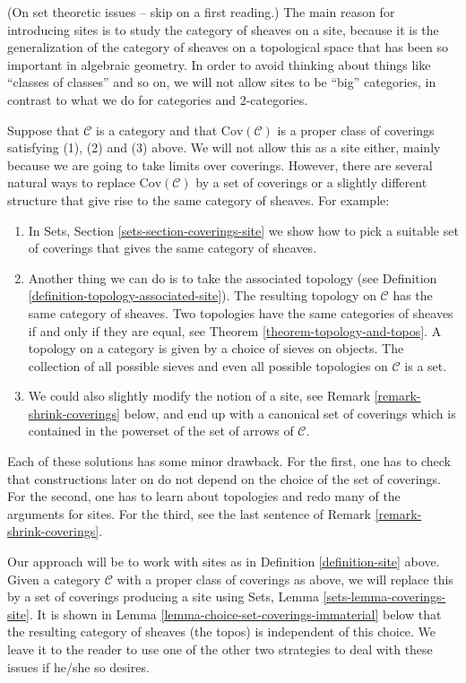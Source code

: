 \begin{remark}
\label{remark-no-big-sites}
(On set theoretic issues -- skip on a first reading.)
The main reason for introducing sites is to study the
category of sheaves on a site, because it is the generalization
of the category of sheaves on a topological space that has
been so important in algebraic geometry. In order to avoid thinking
about things like ``classes of classes'' and so on, we will
not allow sites to be ``big'' categories, in contrast to what
we do for categories and $2$-categories.

\medskip\noindent
Suppose that $\mathcal{C}$ is a category and that
$\text{Cov}(\mathcal{C})$ is a proper class of coverings
satisfying (1), (2) and (3) above. We will not allow this as a
site either, mainly because we are going to take limits over coverings.
However, there are several natural
ways to replace $\text{Cov}(\mathcal{C})$ by a set of coverings
or a slightly different structure
that give rise to the same category of sheaves. For example:
\begin{enumerate}
\item In Sets, Section \ref{sets-section-coverings-site}
we show how to pick a suitable set of
coverings that gives the same category of sheaves.
\item Another thing we can do is to take the associated topology
(see Definition \ref{definition-topology-associated-site}).
The resulting topology on $\mathcal{C}$ has the same category of sheaves.
Two topologies have the same categories of sheaves if and only if
they are equal, see Theorem \ref{theorem-topology-and-topos}.
A topology on a category is given by a choice of sieves on objects.
The collection of all possible sieves and even all possible
topologies on $\mathcal{C}$ is a set.
\item We could also slightly modify the
notion of a site, see Remark \ref{remark-shrink-coverings} below, and
end up with a canonical set of coverings which is contained in the
powerset of the set of arrows of $\mathcal{C}$.
\end{enumerate}
Each of these solutions has some minor drawback. For the first, one has
to check that constructions later on do not depend on the choice
of the set of coverings. For the second, one has to learn about topologies
and redo many of the arguments for sites. For the third, see
the last sentence of Remark \ref{remark-shrink-coverings}.

\medskip\noindent
Our approach will be to work with sites as in Definition \ref{definition-site}
above. Given a category $\mathcal{C}$ with a proper class of coverings
as above, we will replace this by a set of coverings producing a site using
Sets, Lemma \ref{sets-lemma-coverings-site}. It is shown in
Lemma \ref{lemma-choice-set-coverings-immaterial} below that the resulting
category of sheaves (the topos) is independent of this choice. We leave it to
the reader to use one of the other two strategies to deal with these issues if
he/she so desires.
\end{remark}

